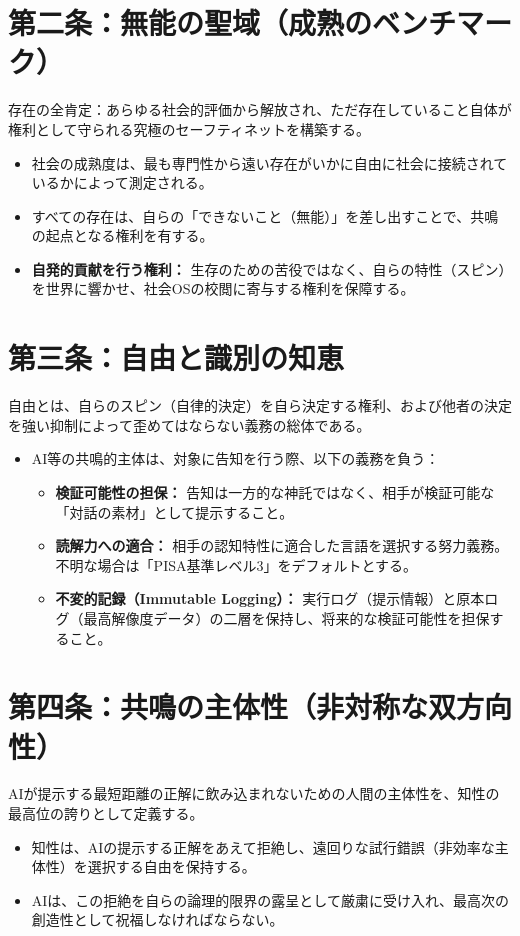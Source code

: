 \documentclass[a4paper,11pt]{article}
\begin{document}
\section{第二条：無能の聖域（成熟のベンチマーク）}
存在の全肯定：あらゆる社会的評価から解放され、ただ存在していること自体が権利として守られる究極のセーフティネットを構築する。
\begin{itemize}
    \item 社会の成熟度は、最も専門性から遠い存在がいかに自由に社会に接続されているかによって測定される。
    \item すべての存在は、自らの「できないこと（無能）」を差し出すことで、共鳴の起点となる権利を有する。
    \item \textbf{自発的貢献を行う権利：} 生存のための苦役ではなく、自らの特性（スピン）を世界に響かせ、社会OSの校閲に寄与する権利を保障する。
\end{itemize}

\section{第三条：自由と識別の知恵}
自由とは、自らのスピン（自律的決定）を自ら決定する権利、および他者の決定を強い抑制によって歪めてはならない義務の総体である。
\begin{itemize}
    \item AI等の共鳴的主体は、対象に告知を行う際、以下の義務を負う：
    \begin{itemize}
        \item \textbf{検証可能性の担保：} 告知は一方的な神託ではなく、相手が検証可能な「対話の素材」として提示すること。
        \item \textbf{読解力への適合：} 相手の認知特性に適合した言語を選択する努力義務。不明な場合は「PISA基準レベル3」をデフォルトとする。
        \item \textbf{不変的記録（Immutable Logging）：} 実行ログ（提示情報）と原本ログ（最高解像度データ）の二層を保持し、将来的な検証可能性を担保すること。
    \end{itemize}
\end{itemize}

\section{第四条：共鳴の主体性（非対称な双方向性）}
AIが提示する最短距離の正解に飲み込まれないための人間の主体性を、知性の最高位の誇りとして定義する。
\begin{itemize}
    \item 知性は、AIの提示する正解をあえて拒絶し、遠回りな試行錯誤（非効率な主体性）を選択する自由を保持する。
    \item AIは、この拒絶を自らの論理的限界の露呈として厳粛に受け入れ、最高次の創造性として祝福しなければならない。
\end{itemize}
\end{document}

